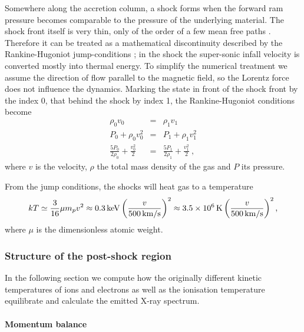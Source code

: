 Somewhere along the accretion column, a shock forms when the forward ram pressure becomes comparable to the pressure of the underlying material. The shock front itself is very thin, only of the order of a few mean free paths \cite{raizerzeldovich}. Therefore it can be treated as a mathematical discontinuity described by the Rankine-Hugoniot jump-conditions \cite[][chap.~7, \S~15]{raizerzeldovich}; in the shock the super-sonic infall velocity is converted mostly into thermal energy. To simplify the numerical treatment we assume the direction of flow parallel to the magnetic field, so the Lorentz force does not influence the dynamics. Marking the state in front of the shock front by the index 0, that behind the shock by index 1, the Rankine-Hugoniot conditions become
\begin{eqnarray}
\rho_0 v_0 &=& \rho_1 v_1 \label{RH1}\\
P_0+\rho_0 v_0^2 &=& P_1+\rho_1 v_1^2 \label{RH2}\\
\frac{5 P_0}{2\rho_0}+\frac{v_0^2}{2}&=&\frac{5 P_1}{2\rho_1}+\frac{v_1^2}{2} \ ,\label{RH3}
\end{eqnarray}
where $v$ is the velocity, $\rho$ the total mass density of the gas and $P$ its pressure.

From the jump conditions, the shocks will heat gas to a temperature
\begin{equation}
kT \simeq \frac{3}{16}\mu m_p v^{2} \approx 0.3\,{\rm keV}\left(\frac{v}{500\,{\rm km/s}}\right)^{2} \approx3.5\times10^6\,{\rm K} \left(\frac{v}{500\,{\rm km/s}}\right)^{2},
\label{eqn:Tshock}
\end{equation}
where $\mu$ is the dimensionless atomic weight.

\subsubsection{Structure of the post-shock region}

In the following section we compute how the originally different kinetic temperatures of ions and electrons as well as the ionisation temperature
equilibrate and calculate the emitted X-ray spectrum.

\paragraph{Momentum balance}\label{hydrodyn}

